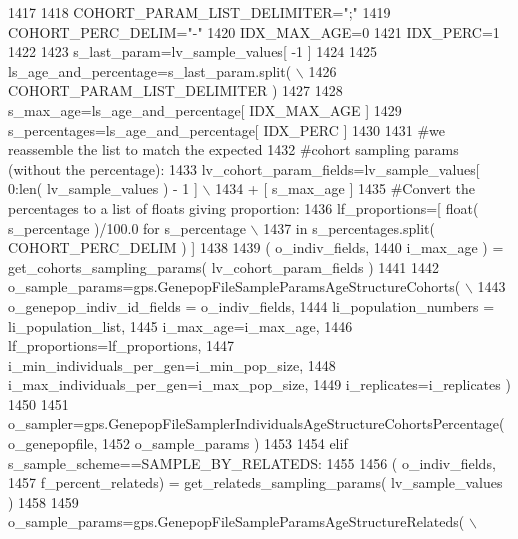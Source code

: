 \begin{DoxyCode}
1417         
1418         COHORT\_PARAM\_LIST\_DELIMITER=\textcolor{stringliteral}{";"}
1419         COHORT\_PERC\_DELIM=\textcolor{stringliteral}{"-"}
1420         IDX\_MAX\_AGE=0
1421         IDX\_PERC=1
1422 
1423         s\_last\_param=lv\_sample\_values[ -1 ]
1424 
1425         ls\_age\_and\_percentage=s\_last\_param.split( \(\backslash\)
1426                         COHORT\_PARAM\_LIST\_DELIMITER )
1427 
1428         s\_max\_age=ls\_age\_and\_percentage[ IDX\_MAX\_AGE ]
1429         s\_percentages=ls\_age\_and\_percentage[ IDX\_PERC ]
1430         
1431         \textcolor{comment}{#we reassemble the list to match the expected}
1432         \textcolor{comment}{#cohort sampling params (without the percentage):}
1433         lv\_cohort\_param\_fields=lv\_sample\_values[ 0:len( lv\_sample\_values ) - 1 ] \(\backslash\)
1434                                                             + [ s\_max\_age ]     
1435         \textcolor{comment}{#Convert the percentages to a list of floats giving proportion:}
1436         lf\_proportions=[ float( s\_percentage )/100.0 \textcolor{keywordflow}{for} s\_percentage  \(\backslash\)
1437                             \textcolor{keywordflow}{in} s\_percentages.split( COHORT\_PERC\_DELIM ) ]
1438 
1439         ( o\_indiv\_fields,
1440                 i\_max\_age ) = get\_cohorts\_sampling\_params( lv\_cohort\_param\_fields )
1441 
1442         o\_sample\_params=gps.GenepopFileSampleParamsAgeStructureCohorts( \(\backslash\)
1443                                             o\_genepop\_indiv\_id\_fields = o\_indiv\_fields,
1444                                             li\_population\_numbers = li\_population\_list,
1445                                             i\_max\_age=i\_max\_age,
1446                                             lf\_proportions=lf\_proportions,
1447                                             i\_min\_individuals\_per\_gen=i\_min\_pop\_size,
1448                                             i\_max\_individuals\_per\_gen=i\_max\_pop\_size,
1449                                             i\_replicates=i\_replicates )
1450 
1451         o\_sampler=gps.GenepopFileSamplerIndividualsAgeStructureCohortsPercentage( o\_genepopfile,
1452                                                                                     o\_sample\_params )
1453                                 
1454     \textcolor{keywordflow}{elif} s\_sample\_scheme==SAMPLE\_BY\_RELATEDS:
1455 
1456             ( o\_indiv\_fields,
1457                 f\_percent\_relateds) = get\_relateds\_sampling\_params( lv\_sample\_values )
1458 
1459             o\_sample\_params=gps.GenepopFileSampleParamsAgeStructureRelateds( \(\backslash\)

\end{DoxyCode}
